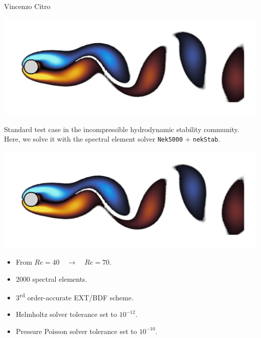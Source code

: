 \documentclass[aspectratio=169, usenames, dvipsnames]{beamer}
\begin{document}
{\begin{frame}
\begin{minipage}{.28\textwidth}
    \bigskip

    {\small
      Vincenzo Citro
    }
  \end{minipage}
  \vfill
\end{frame}

\begin{frame}
  \vfill
  \vfill
  \begin{minipage}{.28\textwidth}
    \centering
    \includegraphics[height=.4\textheight, angle=-90, origin=c]{von_karman_bis}
  \end{minipage}%
  \hfill
  \begin{minipage}{.68\textwidth}
    Standard test case in the incompressible hydrodynamic stability community.
    Here, we solve it with the spectral element solver \texttt{Nek5000} + \texttt{nekStab}.
  \end{minipage}
  \vfill
\end{frame}

\begin{frame}
  \vfill
  \vfill
  \begin{minipage}{.28\textwidth}
    \centering
    \includegraphics[height=.4\textheight, angle=-90, origin=c]{von_karman_bis}
  \end{minipage}%
  \hfill
  \begin{minipage}{.68\textwidth}
    \begin{itemize}
    \item From $Re = 40 \quad \to \quad Re = 70$.\\
      \medskip
    \item 2000 spectral elements.
      \medskip
    \item 3\textsuperscript{rd} order-accurate EXT/BDF scheme.
      \medskip
    \item Helmholtz solver tolerance set to $10^{-12}$.
      \medskip
    \item Pressure Poisson solver tolerance set to $10^{-10}$.
    \end{itemize}
  \end{minipage}
  \vfill
\end{frame}


}
\end{document}
